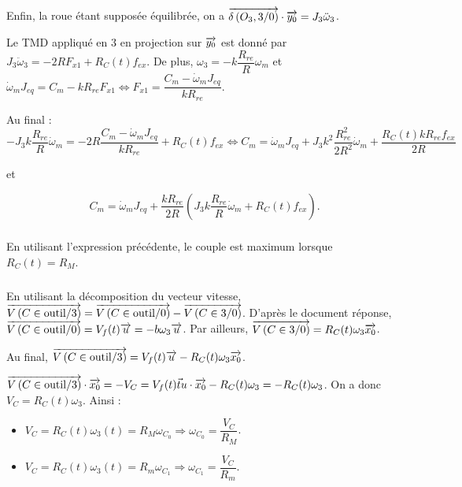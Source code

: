 \documentclass[10pt,fleqn]{article} %
\begin{document}
Enfin, la roue étant supposée équilibrée, on a $\overrightarrow{\delta \left( {O_3}, {3} /{0}\right)}\cdot\overrightarrow{y_0}=J_3\ddot{\omega}_3$.


Le TMD appliqué en 3 en projection sur $\overrightarrow{y_0}$  est donné par 
$J_3\ddot{\omega}_3=-2RF_{x1}+R_C(t) f_{ex}$. De plus, 
$\omega_3= -k\dfrac{R_{re}}{R}\omega_m$ et 
$\dot{\omega}_m J_{eq}= C_m-kR_{re}F_{x1} \Leftrightarrow F_{x1}= \dfrac{C_m-\dot{\omega}_m J_{eq}}{kR_{re}}$.

Au final :
$$-J_3k\dfrac{R_{re}}{R}\dot{\omega}_m=-2R\dfrac{C_m-\dot{\omega}_m J_{eq}}{kR_{re}}+R_C(t) f_{ex} \Leftrightarrow
C_m=\dot{\omega}_m J_{eq}
+J_3k^2\dfrac{R_{re}^2}{2R^2}\dot{\omega}_m+ \dfrac{R_C(t) kR_{re} f_{ex}}{2R}$$

et

$$C_m=\dot{\omega}_m J_{eq}
+\dfrac{kR_{re} }{2R}\left(J_3k\dfrac{R_{re}}{R}\dot{\omega}_m+ R_C(t)  f_{ex}\right).$$


%
%
%
% 

\subparagraph{}
En utilisant l'expression précédente, le couple est maximum lorsque $R_C(t)=R_M$.

\subparagraph{}
En utilisant la décomposition du vecteur vitesse, 
$\overrightarrow{V\left( {C} \in {\text{outil}}/{3}\right)}=\overrightarrow{V\left( {C} \in {\text{outil}}/{0}\right)}-\overrightarrow{V\left( {C} \in {\text{3}}/{0}\right)}$. 
D'après le document réponse, $\overrightarrow{V\left( {C} \in {\text{outil}}/{0}\right)}=V_f(t)\overrightarrow{u}=-b\omega_3\overrightarrow{u}$. Par ailleurs, $\overrightarrow{V\left( {C} \in {\text{3}}/{0}\right)}=R_C(t)\omega_3\overrightarrow{x_0}$.

Au final, $\overrightarrow{V\left( {C} \in {\text{outil}}/{3}\right)}=V_f(t)\overrightarrow{u}-R_C(t)\omega_3\overrightarrow{x_0}$.

$\overrightarrow{V\left( {C} \in {\text{outil}}/{3}\right)} \cdot \overrightarrow{x_0} = -V_C =  V_f(t)\vec t{u}\cdot \overrightarrow{x_0}-R_C(t)\omega_3 = -R_C(t)\omega_3$. On a donc $V_C=R_C(t)\omega_3$. Ainsi : 
\begin{itemize}
\item $V_C=R_C(t)\omega_3(t)=R_M \omega_{C_0}\Rightarrow \omega_{C_0}=\dfrac{V_C}{R_M}$.
\item $V_C=R_C(t)\omega_3(t)=R_m \omega_{C_1}\Rightarrow \omega_{C_1}=\dfrac{V_C}{R_m}$.
\end{itemize}
 
\end{document}
